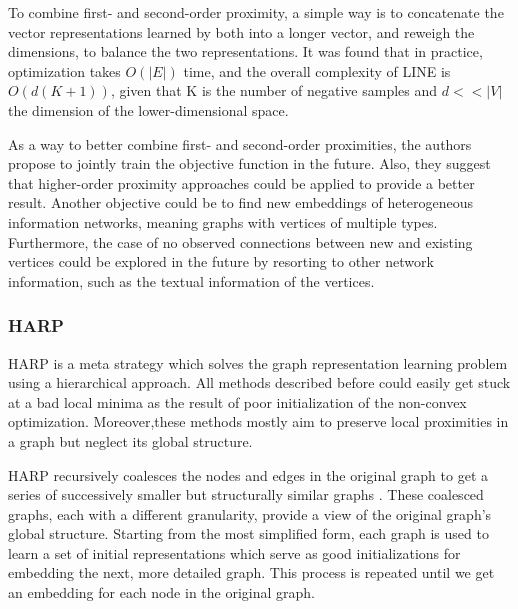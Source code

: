 To combine first- and second-order proximity, a simple way is to concatenate the vector representations learned by both into a longer vector, and reweigh the dimensions, to balance the two representations. It was found that in practice, optimization takes $O(|E|)$ time, and the overall complexity of LINE is $O(d(K+1))$, given that K is the number of negative samples and $d<<|V|$ the dimension of the lower-dimensional space.

As a way to better combine first- and second-order proximities, the authors propose to jointly train the objective function in the future. Also, they suggest that higher-order proximity approaches could be applied to provide a better result. Another objective could be to find new embeddings of heterogeneous information networks, meaning graphs with vertices of multiple types. Furthermore, the case of no observed connections between new and existing vertices could be explored in the future by resorting to other network information, such as the textual information of the vertices.

\subsubsection*{HARP}

HARP is a meta strategy which solves the graph representation learning problem using a hierarchical approach. 
All methods described before could easily get stuck at a bad local minima as the result of poor initialization of the non-convex optimization. Moreover,these methods mostly aim to preserve local proximities in a graph but neglect its global structure.

HARP recursively coalesces the nodes and edges in the original graph to get a series of successively smaller but structurally similar graphs . These coalesced graphs, each with a different granularity, provide a view of the original graph’s global structure. Starting from the most simplified form, each graph is used to learn a set of initial representations which serve as good initializations for embedding the next, more detailed graph. This process is repeated until we get an embedding for each node in the original graph.

